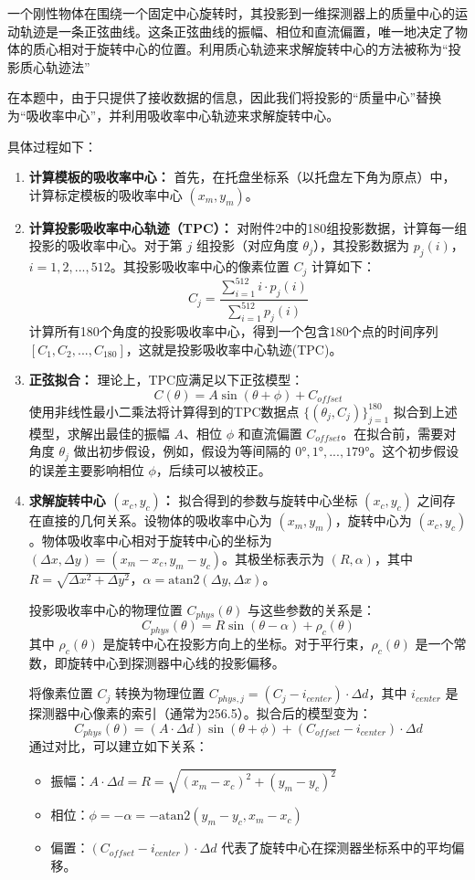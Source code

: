 一个刚性物体在围绕一个固定中心旋转时，其投影到一维探测器上的质量中心的运动轨迹是一条正弦曲线。这条正弦曲线的振幅、相位和直流偏置，唯一地决定了物体的质心相对于旋转中心的位置。利用质心轨迹来求解旋转中心的方法被称为“投影质心轨迹法”\par
在本题中，由于只提供了接收数据的信息，因此我们将投影的“质量中心”替换为“吸收率中心”，并利用吸收率中心轨迹来求解旋转中心。\par
具体过程如下：
\begin{enumerate}
    \item \textbf{计算模板的吸收率中心：} 首先，在托盘坐标系（以托盘左下角为原点）中，计算标定模板的吸收率中心 $(x_m,y_m)$。
    \item \textbf{计算投影吸收率中心轨迹（TPC）：} 对附件2中的180组投影数据，计算每一组投影的吸收率中心。对于第 $j$ 组投影（对应角度 $\theta_j$），其投影数据为 $p_j(i)$，$i=1,2,...,512$。其投影吸收率中心的像素位置 $C_j$ 计算如下：
       $$C_j=\frac{\sum_{i=1}^{512}i\cdot p_j(i)}{\sum_{i=1}^{512}p_j(i)}$$
       计算所有180个角度的投影吸收率中心，得到一个包含180个点的时间序列 $[C_1,C_2,...,C_{180}]$，这就是投影吸收率中心轨迹(TPC)。
    \item \textbf{正弦拟合：} 理论上，TPC应满足以下正弦模型：
       $$C(\theta)=A\sin(\theta+\phi)+C_{offset}$$
       使用非线性最小二乘法将计算得到的TPC数据点 $\{(\theta_j,C_j)\}_{j=1}^{180}$ 拟合到上述模型，求解出最佳的振幅 $A$、相位 $\phi$ 和直流偏置 $C_{offset}$。在拟合前，需要对角度 $\theta_j$ 做出初步假设，例如，假设为等间隔的 $0°,1°,...,179°$。这个初步假设的误差主要影响相位 $\phi$，后续可以被校正。
    \item \textbf{求解旋转中心 $(x_c,y_c)$：} 拟合得到的参数与旋转中心坐标 $(x_c,y_c)$ 之间存在直接的几何关系。设物体的吸收率中心为 $(x_m,y_m)$，旋转中心为 $(x_c,y_c)$。物体吸收率中心相对于旋转中心的坐标为 $(\Delta x,\Delta y)=(x_m-x_c,y_m-y_c)$。其极坐标表示为 $(R,\alpha)$，其中 $R=\sqrt{\Delta x^2+\Delta y^2}$，$\alpha=\text{atan2}(\Delta y,\Delta x)$。
       
       投影吸收率中心的物理位置 $C_{phys}(\theta)$ 与这些参数的关系是：
       $$C_{phys}(\theta)=R\sin(\theta-\alpha)+\rho_c(\theta)$$
       其中 $\rho_c(\theta)$ 是旋转中心在投影方向上的坐标。对于平行束，$\rho_c(\theta)$ 是一个常数，即旋转中心到探测器中心线的投影偏移。
       
       将像素位置 $C_j$ 转换为物理位置 $C_{phys,j}=(C_j-i_{center})\cdot\Delta d$，其中 $i_{center}$ 是探测器中心像素的索引（通常为256.5）。拟合后的模型变为：
       $$C_{phys}(\theta)=(A\cdot\Delta d)\sin(\theta+\phi)+(C_{offset}-i_{center})\cdot\Delta d$$
       通过对比，可以建立如下关系：
       \begin{itemize}
           \item 振幅：$A\cdot\Delta d=R=\sqrt{(x_m-x_c)^2+(y_m-y_c)^2}$
           \item 相位：$\phi=-\alpha=-\text{atan2}(y_m-y_c,x_m-x_c)$
           \item 偏置：$(C_{offset}-i_{center})\cdot\Delta d$ 代表了旋转中心在探测器坐标系中的平均偏移。
       \end{itemize}
\end{enumerate}

